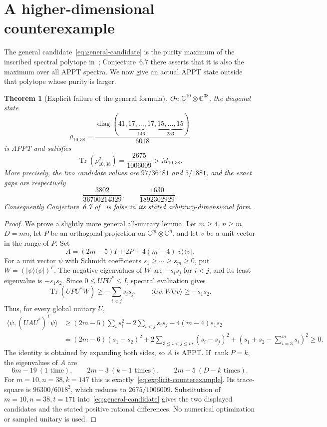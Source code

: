 \documentclass[11pt]{article}
\newtheorem{theorem}{Theorem}[section]
\theoremstyle{remark}\newtheorem{remark}[theorem]{Remark}
\newcommand{\Tr}{\operatorname{Tr}}
\newcommand{\C}{\mathbb C}
\begin{document}
\section{A higher-dimensional counterexample}
\label{sec:counterexample}
The general candidate~\eqref{eq:general-candidate} is the purity maximum of the inscribed spectral polytope in~\cite{AKW}; Conjecture~6.7 there asserts that it is also the maximum over all APPT spectra. We now give an actual APPT state outside that polytope whose purity is larger.

\begin{theorem}[Explicit failure of the general formula]\label{thm:counterexample}
On $\C^{10}\otimes\C^{38}$, the diagonal state
\begin{equation}\label{eq:explicit-counterexample}
 \rho_{10,38}=\frac{\operatorname{diag}(41,\underbrace{17,\ldots,17}_{146},
 \underbrace{15,\ldots,15}_{233})}{6018}
\end{equation}
is APPT and satisfies
\[
 \Tr(\rho_{10,38}^2)=\frac{2675}{1006009}>M_{10,38}.
\]
More precisely, the two candidate values are $97/36481$ and $5/1881$, and the exact gaps are respectively
\[
 \frac{3802}{36700214329},\qquad \frac{1630}{1892302929}.
\]
Consequently Conjecture~6.7 of~\cite{AKW} is false in its stated arbitrary-dimensional form.
\end{theorem}

\begin{proof}
We prove a slightly more general all-unitary lemma. Let $m\geq4$, $n\geq m$, $D=mn$, let $P$ be an orthogonal projection on $\C^m\otimes\C^n$, and let $v$ be a unit vector in the range of $P$. Set
\[
 A=(2m-5)I+2P+4(m-4)\lvert v\rangle\langle v\rvert.
\]
For a unit vector $\psi$ with Schmidt coefficients $s_1\geq\cdots\geq s_m\geq0$, put $W=(\lvert\psi\rangle\langle\psi\rvert)^\Gamma$. The negative eigenvalues of $W$ are $-s_i s_j$ for $i<j$, and its least eigenvalue is $-s_1s_2$. Since $0\leq UPU^*\leq I$, spectral evaluation gives
\[
 \Tr(UPU^*W)\geq-\sum_{i<j}s_i s_j,
 \qquad
 \langle Uv,WUv\rangle\geq-s_1s_2.
\]
Thus, for every global unitary $U$,
\begin{align*}
 \langle\psi,(UAU^*)^\Gamma\psi\rangle
 &\geq (2m-5)\sum_i s_i^2-2\sum_{i<j}s_i s_j
       -4(m-4)s_1s_2\\
 &= (2m-6)(s_1-s_2)^2
 +2\sum_{3\leq i<j\leq m}(s_i-s_j)^2
 +(s_1+s_2-\sum_{i=3}^m s_i)^2\geq0.
\end{align*}
The identity is obtained by expanding both sides, so $A$ is APPT. If $\operatorname{rank}P=k$, the eigenvalues of $A$ are
\[
 6m-19\ (1\text{ time}),\qquad 2m-3\ (k-1\text{ times}),
 \qquad 2m-5\ (D-k\text{ times}).
\]
For $m=10,n=38,k=147$ this is exactly~\eqref{eq:explicit-counterexample}. Its trace-square is $96300/6018^2$, which reduces to $2675/1006009$. Substitution of $m=10,n=38,t=171$ into~\eqref{eq:general-candidate} gives the two displayed candidates and the stated positive rational differences. No numerical optimization or sampled unitary is used.
\end{proof}
\end{document}
